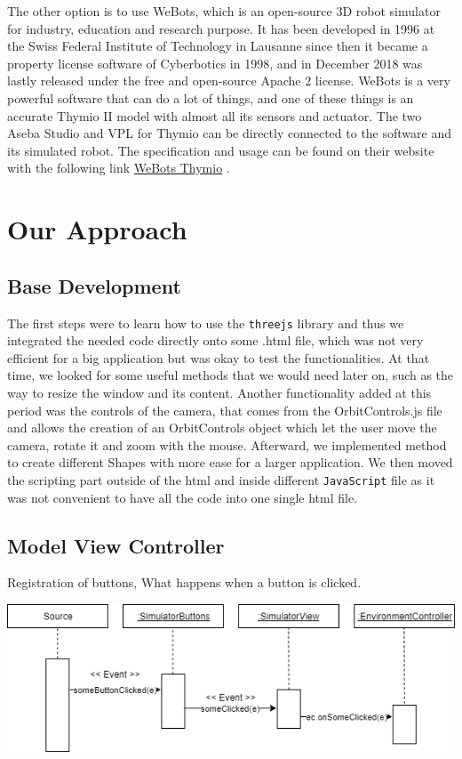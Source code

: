 \documentclass{scrbook}
\begin{document}
The other option is to use WeBots, which is an open-source 3D robot simulator for industry, education and research purpose. 
It has been developed in 1996 at the Swiss Federal Institute of Technology in Lausanne since then it became a property license software of Cyberbotics in 1998, 
and in December 2018 was lastly released under the free and open-source Apache 2 license.
WeBots is a very powerful software that can do a lot of things, and one of these things is an accurate Thymio II model with almost all its sensors and actuator. 
The two Aseba Studio and VPL for Thymio can be directly connected to the software and its simulated robot. 
The specification and usage can be found on their website with the following link \href{https://www.cyberbotics.com/doc/guide/thymio2#mosybas-thymio-ii}{WeBots Thymio} .

\chapter{Our Approach}

\section{Base Development}

The first steps were to learn how to use the \texttt{threejs} library and thus we integrated the needed code directly onto some .html file, which was not very efficient for a big application but was okay to test the functionalities. 
At that time, we looked for some useful methods that we would need later on, such as the way to resize the window and its content. Another functionality added at this period was the controls of the camera, that comes from the OrbitControls.js file and allows the creation of an OrbitControls object which let the user move the camera, rotate it and zoom with the mouse.
Afterward, we implemented method to create different Shapes with more ease for a larger application. We then moved the scripting part outside of the html and inside different \texttt{JavaScript} file as it was not convenient to have all the code into one single html file.


\section{Model View Controller}
Registration of buttons,
What happens when a button is clicked.
\begin{center}
  \includegraphics[width=\textwidth]{./button_mvc}
\end{center}
\end{document}
